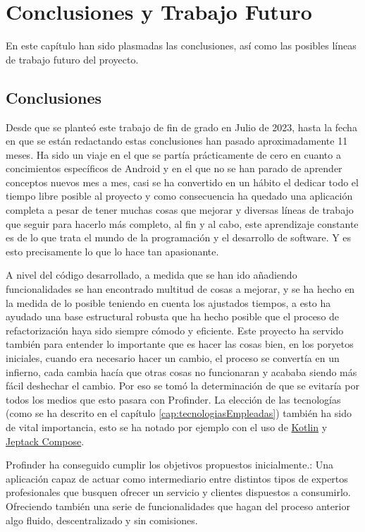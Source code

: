 \chapter{Conclusiones y Trabajo Futuro}
\label{cap:conclusiones}
En este capítulo han sido plasmadas las conclusiones, así como las posibles líneas de trabajo futuro del proyecto.
\section{Conclusiones}
Desde que se planteó este trabajo de fin de grado en Julio de 2023, hasta la fecha en que se están redactando estas conclusiones han pasado aproximadamente 11 meses. Ha sido un viaje en el que se partía prácticamente de cero en cuanto a concimientos específicos de Android y en el que no se han parado de aprender conceptos nuevos mes a mes, casi se ha convertido en un hábito el dedicar todo el tiempo libre posible al proyecto y como consecuencia ha quedado una aplicación completa a pesar de tener muchas cosas que mejorar y diversas líneas de trabajo que seguir para hacerlo más completo, al fin y al cabo, este aprendizaje constante es de lo que trata el mundo de la programación y el desarrollo de software. Y es esto precisamente lo que lo hace tan apasionante.

A nivel del código desarrollado, a medida que se han ido añadiendo funcionalidades se han encontrado multitud de cosas a mejorar, y se ha hecho en la medida de lo posible teniendo en cuenta los ajustados tiempos, a esto ha ayudado una base estructural robusta que ha hecho posible que el proceso de refactorización haya sido siempre cómodo y eficiente. Este proyecto ha servido también para entender lo importante que es hacer las cosas bien, en los poryetos iniciales, cuando era necesario hacer un cambio, el proceso se convertía en un infierno, cada cambia hacía que otras cosas no funcionaran y acababa siendo más fácil deshechar el cambio. Por eso se tomó la determinación de que se evitaría por todos los medios que esto pasara con Profinder. La elección de las tecnologías (como se ha descrito en el capítulo \ref{cap:tecnologiasEmpleadas}) también ha sido de vital importancia, esto se ha notado por ejemplo con el uso de \hyperlink{subsec:kotlin}{Kotlin} y \hyperlink{subsec:compose}{Jeptack Compose}.

Profinder ha conseguido cumplir los objetivos propuestos inicialmente.: Una aplicación capaz de actuar como intermediario entre distintos tipos de expertos profesionales que busquen ofrecer un servicio y clientes dispuestos a consumirlo. Ofreciendo también una serie de funcionalidades que hagan del proceso anterior algo fluido, descentralizado y sin comisiones.

